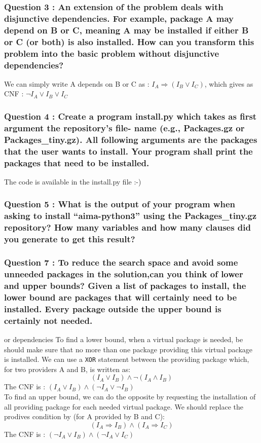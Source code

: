 \documentclass[a4paper,10pt]{article}
\begin{document}
\subsubsection{Question 3 : An extension of the problem deals with disjunctive dependencies. For example, package A may depend on B or C, meaning A may be installed if either B or C (or both) is also installed. How can you transform this problem into the basic problem without disjunctive dependencies?}
We can simply write A depends on B or C as : $I_{A} \Rightarrow (I_{B} \vee I_{C})$, which gives as CNF : $\neg I_{A} \vee I_{B} \vee I_{C}$

\subsubsection{Question 4 : Create a program install.py which takes as first argument the repository’s file- name (e.g., Packages.gz or Packages\_tiny.gz). All following arguments are the packages that the user wants to install. Your program shall print the packages that need to be installed.}
The code is available in the install.py file :-)

\subsubsection{Question 5 : What is the output of your program when asking to install “aima-python3” using the Packages\_tiny.gz repository? How many variables and how many clauses did you generate to get this result?}



\subsubsection{Question 7 : To reduce the search space and avoid some unneeded packages in the solution,can you think of lower and upper bounds? Given a list of packages to install, the lower bound are packages that will certainly need to be installed. Every package outside the upper bound is certainly not needed.}
{\huge or dependencies}
To find a lower bound, when a virtual package is needed, be should make sure that no more than one package providing this virtual package is installed. We can use a \texttt{XOR} statement between the providing package which, for two providers A and B, is written as:
$$(I_{A} \vee I_{B}) \wedge \neg (I_{A} \wedge I_{B})$$
The CNF is : $(I_{A} \vee I_{B}) \wedge (\neg I_{A} \vee \neg I_{B})$\\
To find an upper bound, we can do the opposite by requesting the installation of all providing package for each needed virtual package. We should replace the prodives condition by (for A provided by B and C): 
$$(I_{A} \Rightarrow I_{B}) \wedge (I_{A} \Rightarrow I_{C})$$ 
The CNF is : $(\neg I_{A} \vee I_{B}) \wedge (\neg I_{A} \vee I_{C})$
\end{document}
